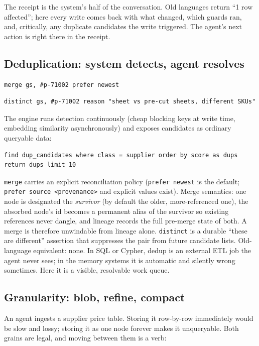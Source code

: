 \documentclass[11pt]{article}
\begin{document}
The receipt is the system's half of the conversation. Old languages return ``1 row affected''; here every write comes back with what changed, which guards ran, and, critically, any duplicate candidates the write triggered. The agent's next action is right there in the receipt.

\subsection{Deduplication: system detects, agent resolves}

\begin{lstlisting}[style=new]
merge gs, #p-71002 prefer newest
\end{lstlisting}
\begin{lstlisting}[style=new]
distinct gs, #p-71002 reason "sheet vs pre-cut sheets, different SKUs"
\end{lstlisting}

The engine runs detection continuously (cheap blocking keys at write time, embedding similarity asynchronously) and exposes candidates as ordinary queryable data:

\begin{lstlisting}[style=new]
find dup_candidates where class = supplier order by score as dups
return dups limit 10
\end{lstlisting}

\texttt{merge} carries an explicit reconciliation policy (\texttt{prefer newest} is the default; \texttt{prefer source <provenance>} and explicit values exist). Merge semantics: one node is designated the \emph{survivor} (by default the older, more-referenced one), the absorbed node's id becomes a permanent alias of the survivor so existing references never dangle, and lineage records the full pre-merge state of both. A merge is therefore unwindable from lineage alone. \texttt{distinct} is a durable ``these are different'' assertion that suppresses the pair from future candidate lists. Old-language equivalent: none. In SQL or Cypher, dedup is an external ETL job the agent never sees; in the memory systems it is automatic and silently wrong sometimes. Here it is a visible, resolvable work queue.

\subsection{Granularity: blob, refine, compact}

An agent ingests a supplier price table. Storing it row-by-row immediately would be slow and lossy; storing it as one node forever makes it unqueryable. Both grains are legal, and moving between them is a verb:
\end{document}
